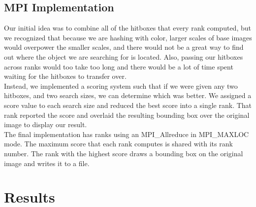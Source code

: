 \documentclass[10pt, journal]{vgtc}                %
\newcommand\tab[1][1cm]{\hspace*{#1}}
\begin{document}
\subsection{MPI Implementation}
\begin{flushleft}
\tab Our initial idea was to combine all of the hitboxes that every rank computed, but we recognized that because we are hashing with color, larger scales of base images would overpower the smaller scales, and there would not be a great way to find out where the object we are searching for is located. Also, passing our hitboxes across ranks would too take too long and there would be a lot of time spent waiting for the hitboxes to transfer over. \\\smallskip
\tab Instead, we implemented a scoring system such that if we were given any two hitboxes, and two search sizes, we can determine which was better. We assigned a score value to each search size and reduced the best score into a single rank. That rank reported the score and overlaid the resulting bounding box over the original image to display our result. \\\smallskip
The final implementation has ranks using an MPI\_Allreduce in MPI\_MAXLOC mode. The maximum score that each rank computes is shared with its rank number. The rank with the highest score draws a bounding box on the original image and writes it to a file.
\end{flushleft}
\section{Results}
\end{document}
